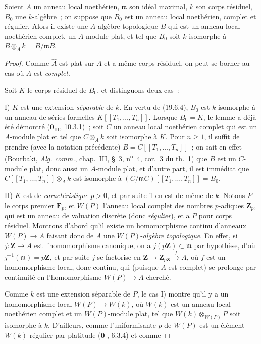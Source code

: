 \begin{lemma}[19.7.1.3]
\label{0.19.7.1.3-fr}
Soient $A$ un anneau local noethérien, $\mathfrak m$ son idéal maximal, $k$ son
corps résiduel, $B_0$ une $k$-algèbre~; on suppose que $B_0$ est un anneau
local noethérien, complet et régulier. Alors il existe une $A$-algèbre
topologique $B$ qui est un anneau local noethérien complet, un $A$-module plat,
et tel que $B_0$ soit $k$-isomorphe à
$B\otimes_A k=B/\mathfrak mB$.
\end{lemma}

\begin{proof}
Comme $\widehat A$ est plat sur $A$ et a même corps résiduel, on peut se borner
au cas où $A$ est \emph{complet}.

Soit $K$ le corps résiduel de $B_0$, et distinguons deux cas~:

\medskip
\noindent I) $K$ est une extension \emph{séparable} de $k$. En vertu de
(19.6.4), $B_0$ est $k$-isomorphe à un anneau de séries formelles
$K[[T_1,\ldots,T_n]]$. Lorsque $B_0=K$, le lemme a déjà été démontré
($\mathbf 0_{\mathrm{III}}$, 10.3.1)~; soit $C$ un anneau local noethérien
complet qui est un $A$-module plat et tel que $C\otimes_A k$ soit isomorphe à
$K$. Pour $n\geq1$, il suffit de prendre (avec la notation précédente)
$B=C[[T_1,\ldots,T_n]]$~; on sait en effet (Bourbaki,
\emph{Alg. comm.}, chap.~III, §~3, n\textsuperscript{o}~4, cor.~3 du th.~1)
que $B$ est un $C$-module plat, donc aussi un $A$-module plat, et d'autre part,
il est immédiat que $C[[T_1,\ldots,T_n]]\otimes_A k$ est isomorphe à
$(C/\mathfrak mC)[[T_1,\ldots,T_n]]=B_0$.

\medskip
\noindent II) $K$ est de \emph{caractéristique} $p>0$, et par suite il en est
de même de $k$. Notons $P$ le corps premier $\mathbf F_p$, et $W(P)$ l'anneau
local complet des nombres $p$-adiques $\mathbf Z_p$, qui est un anneau de
valuation discrète (donc \emph{régulier}), et a $P$ pour corps résiduel.
Montrons d'abord qu'il existe un homomorphisme continu d'anneaux $W(P)\to A$
faisant donc de $A$ une $W(P)$-\emph{algèbre topologique}. En effet, si
$j:\mathbf Z\to A$ est l'homomorphisme canonique, on a
$j(p\mathbf Z)\subset\mathfrak m$ par hypothèse, d'où
$j^{-1}(\mathfrak m)=p\mathbf Z$, et par suite $j$ se factorise en
$\mathbf Z\to\mathbf Z_{p\mathbf Z}\xrightarrow{f}A$, où $f$ est un
homomorphisme local, donc continu, qui (puisque $A$ est complet) se prolonge
par continuité en l'homomorphisme $W(P)\to A$ cherché.

Comme $k$ est une extension séparable de $P$, le cas I) montre qu'il y a un
homomorphisme local $W(P)\to W(k)$, où $W(k)$ est un anneau local noethérien
complet et un $W(P)$-module plat, tel que $W(k)\otimes_{W(P)}P$ soit isomorphe
à $k$. D'ailleurs, comme l'uniformisante $p$ de $W(P)$ est un élément
$W(k)$-régulier par platitude ($\mathbf 0_{\mathrm I}$, 6.3.4) et comme


\end{proof}
